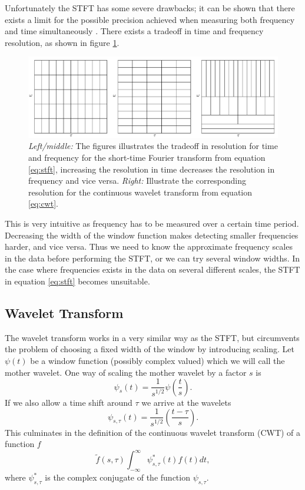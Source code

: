 \documentclass[a4paper]{memoir}
\theoremstyle{plain}
\theoremstyle{definition}
\theoremstyle{remark}
\begin{document}
Unfortunately the STFT has some severe drawbacks; it can be shown that there exists a limit for the possible precision achieved when measuring both frequency and time simultaneously \cite{kaiser}.
There exists a tradeoff in time and frequency resolution, as shown in figure \ref{fig:grid}.
\begin{figure}[tb]
        \centering
        \includegraphics[width=\linewidth]{./figures/stft_cwt_grid/stft_cwt_grid.pdf}
        \caption{
        \textit{Left/middle:} The figures illustrates the tradeoff in resolution for time and frequency for the short-time Fourier transform from equation \eqref{eq:stft}, increasing the resolution in time decreases the resolution in frequency and vice versa.
\textit{Right:} Illustrate the corresponding resolution for the continuous wavelet transform from equation \eqref{eq:cwt}.
}
        \label{fig:grid}
\end{figure}
This is very intuitive as frequency has to be measured over a certain time period.
Decreasing the width of the window function makes detecting smaller frequencies harder, and vice versa.
Thus we need to know the approximate frequency scales in the data before performing the STFT, or we can try several window widths.
In the case where frequencies exists in the data on several different scales, the STFT in equation \eqref{eq:stft} becomes unsuitable.



\subsection{Wavelet Transform}
The wavelet transform works in a very similar way as the STFT, but circumvents the problem of choosing a fixed width of the window by introducing scaling.
Let $\psi(t)$ be a window function (possibly complex valued) which we will call the mother wavelet.
One way of scaling the mother wavelet by a factor $s$ is
\begin{equation*}
        \psi_s(t) = \frac{1}{s^{1/2}} \psi \left(\frac{t}{s}\right).
\end{equation*}
If we also allow a time shift around $\tau$ we arrive at the wavelets
\begin{equation*}
        \psi_{s,\tau}(t) = \frac{1}{s^{1/2}} \left( \frac{t - \tau}{s} \right).
\end{equation*}
This culminates in the definition of the continuous wavelet transform (CWT) of a function $f$ \cite{kaiser}
\begin{equation}\label{eq:cwt}
        \tilde{f}(s, \tau)\int_{-\infty}^{\infty}\psi_{s,\tau}^*(t)f(t) dt,
\end{equation}
where $\psi_{s,\tau}^*$ is the complex conjugate of the function $\psi_{s, \tau}$.
\end{document}
